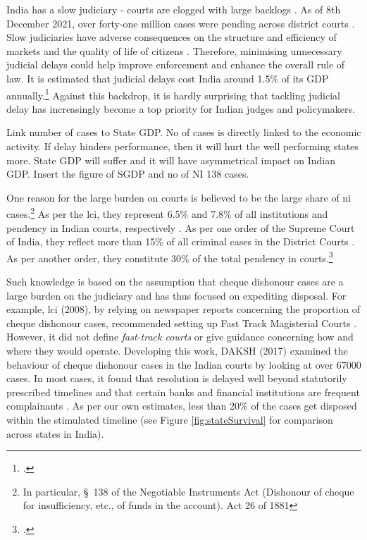India has a slow judiciary - courts are clogged with large backlogs \autocite{moog1992delays, debroy2008justice, dutta2019modernise}. As of 8th December 2021, over forty-one million cases were pending across district courts \autocite{njdg2021}. Slow judiciaries have adverse consequences on the structure and efficiency of markets and the quality of life of citizens \autocite{world2004world, chemin2007impact, rao2020institutional}. Therefore, minimising unnecessary judicial delays could help improve enforcement and enhance the overall rule of law. It is estimated that judicial delays cost India around 1.5\% of its GDP annually.\footcite{dey2016_cost} Against this backdrop, it is hardly surprising that tackling judicial delay has increasingly become a top priority for Indian judges and policymakers.

Link number of cases to State GDP. No of cases is directly linked to the economic activity. If delay hinders performance, then it will hurt the well performing states more. State GDP will suffer and it will have asymmetrical impact on Indian GDP. Insert the figure of SGDP and no of NI 138 cases.

One reason for the large burden on courts is believed to be the large share of \gls{ni} cases.\footnote{In particular, \S~138 of the Negotiable Instruments Act (Dishonour of cheque for insufficiency, etc., of funds in the account). Act 26 of 1881} As per the \gls{lci}, they represent 6.5\% and 7.8\% of all institutions and pendency in Indian courts, respectively \autocite{lci2014_arrears}. As per one order of the Supreme Court of India, they reflect more than 15\% of all criminal cases in the District Courts \autocite{sc2020_makwanavstate}. As per another order, they constitute 30\% of the total pendency in courts.\footcite[Similarly, a study published by the Department of Justice briefly touches on the burden of such cases on the judiciary and posits that they constitute 34\% of pending criminal cases in Maharashtra.][]{sc2020_138, mahadik2018_maharashtra}

Such knowledge is based on the assumption that cheque dishonour cases are a large burden on the judiciary and has thus focused on expediting disposal. For example, \gls{lci} (2008), by relying on newspaper reports concerning the proportion of cheque dishonour cases, recommended setting up Fast Track Magisterial Courts \autocite{lci2008_138, bhan2015_placing}. However, it did not define \textit{fast-track courts} or give guidance concerning how and where they would operate. Developing this work, DAKSH (2017) examined the behaviour of cheque dishonour cases in the Indian courts by looking at over 67000 cases. In most cases, it found that resolution is delayed well beyond statutorily prescribed timelines and that certain banks and financial institutions are frequent complainants \autocite{sridhar2017_cheque}. As per our own estimates, less than 20\% of the cases get disposed within the stimulated timeline (see Figure \ref{fig:stateSurvival} for comparison across states in India).

